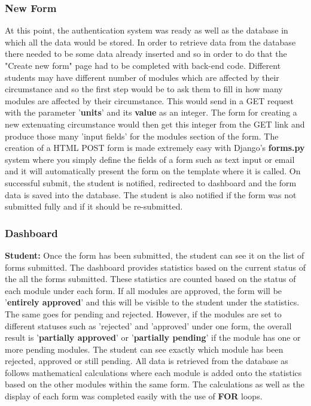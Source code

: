 \documentclass[../main.tex]{subfiles}
\begin{document}
\subsubsection{New Form}
At this point, the authentication system was ready as well as the database in which all the data would be stored. In order to retrieve data from the database there needed to be some data already inserted and so in order to do that the "Create new form" page had to be completed with back-end code. Different students may have different number of modules which are affected by their circumstance and so the first step would be to ask them to fill in how many modules are affected by their circumstance. This would send in a GET request with the parameter '\textbf{units}' and its \textbf{value} as an integer. The form for creating a new extenuating circumstance would then get this integer from the GET link and produce those many 'input fields' for the modules section of the form. The creation of a HTML POST form is made extremely easy with Django's \textbf{forms.py} system where you simply define the fields of a form such as text input or email and it will automatically present the form on the template where it is called. On successful submit, the student is notified, redirected to dashboard and the form data is saved into the database. The student is also notified if the form was not submitted fully and if it should be re-submitted.

\subsubsection{Dashboard} 
\textbf{Student:} Once the form has been submitted, the student can see it on the list of forms submitted. The dashboard provides statistics based on the current status of the all the forms submitted. These statistics are counted based on the status of each module under each form. If all modules are approved, the form will be '\textbf{entirely approved}' and this will be visible to the student under the statistics. The same goes for pending and rejected. However, if the modules are set to different statuses such as 'rejected' and 'approved' under one form, the overall result is '\textbf{partially approved}' or '\textbf{partially pending}' if the module has one or more pending modules. The student can see exactly which module has been rejected, approved or still pending.  All data is retrieved from the database as follows mathematical calculations where each module is added onto the statistics based on the other modules within the same form. The calculations as well as the display of each form was completed easily with the use of \textbf{FOR} loops.\\[4mm]
\end{document}
